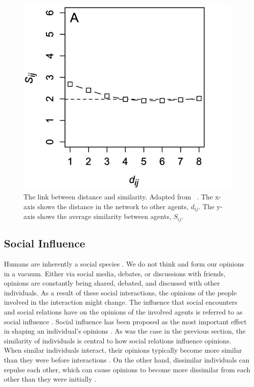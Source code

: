 \documentclass[11pt]{article}
\begin{document}
\begin{figure}[H]
   \centering
   \includegraphics[width=.5\linewidth]{../plots/references/kossinets_watts_distance.jpeg}
 \caption{The link between distance and similarity. Adapted from \ \protect{}. The x-axis shows the distance in the network to other agents, $d_{ij}$. The y-axis shows the average similarity between agents, $S_{ij}$.}
 \label{fig:distance_similarity}
\end{figure}

\subsection{Social Influence}
Humans are inherently a social species \cite{kurzban2015evolution}. We do not think and form our opinions in a vacuum. Either via social media, debates, or discussions with friends, opinions are constantly being shared, debated, and discussed with other individuals. 
As a result of these social interactions, the opinions of the people involved in the interaction might change. 
The influence that social encounters and social relations have on the opinions of the involved agents is referred to as social influence \cite{friedkin_social_1990}. Social influence has been proposed as the most important effect in shaping an individual's opinions \cite{chacoma_opinion_2015, flache_between_2018}. As was the case in the previous section, the similarity of individuals is central to how social relations influence opinions. When similar individuals interact, their opinions typically become more similar than they were before interactions \cite{takacs_discrepancy_2016}. On the other hand, dissimilar individuals can repulse each other, which can cause opinions to become more dissimilar from each other than they were initially \cite{hilmert2006positive, cikara2014neuroscience}.  
\end{document}
